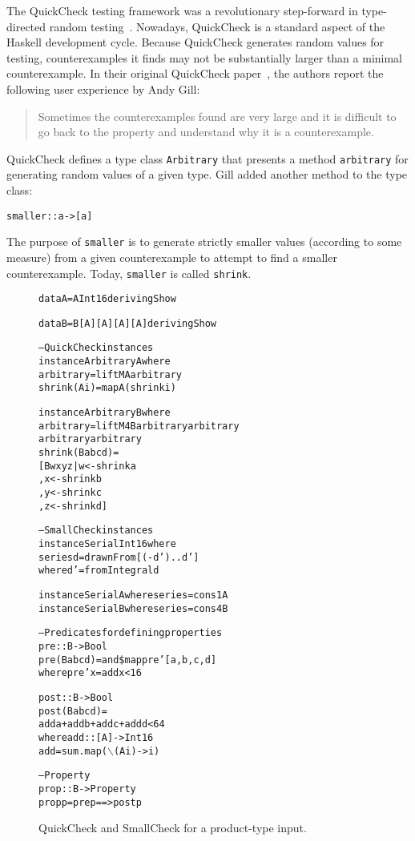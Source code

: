 \documentclass[10pt]{sigplanconf}
\newenvironment{code}{\begin{alltt}}{\end{alltt}}
\newcommand{\ttp}[1]{\texttt{#1}}
\begin{document}
The QuickCheck testing framework was a revolutionary step-forward in
type-directed random testing~\cite{qc}.  Nowadays, QuickCheck is a standard
aspect of the Haskell development cycle.  Because QuickCheck generates random
values for testing, counterexamples it finds may not be substantially larger
than a minimal counterexample.  In their original QuickCheck paper~\cite{qc},
the authors report the following user experience by Andy Gill:
%
\begin{quote}
Sometimes the counterexamples found are very large and it is difficult to go
back to the property and understand why it is a counterexample.
\end{quote}
%
\noindent
QuickCheck defines a type class \ttp{Arbitrary} that presents a method
\ttp{arbitrary} for generating random values of a given type.  Gill added another
method to the type class:
%
\begin{code}
smaller :: a -> [a] 
\end{code}
%
\noindent
The purpose of \ttp{smaller} is to generate strictly smaller values (according to
some measure) from a given counterexample to attempt to find a smaller
counterexample.  Today, \ttp{smaller} is called \ttp{shrink}.

\begin{figure}[ht]
\begin{code}
data A = A Int16 deriving Show

data B = B [A] [A] [A] [A] deriving Show

-- QuickCheck instances
instance Arbitrary A where
  arbitrary    = liftM A arbitrary
  shrink (A i) = map A (shrink i)

instance Arbitrary B where
  arbitrary = liftM4 B arbitrary arbitrary 
                       arbitrary arbitrary
  shrink (B a b c d) = 
    [ B w x y z | w <- shrink a
                , x <- shrink b
                , y <- shrink c
                , z <- shrink d ]

-- SmallCheck instances
instance Serial Int16 where
  series d = drawnFrom [(-d')..d'] 
    where d' = fromIntegral d

instance Serial A where series = cons1 A 
instance Serial B where series = cons4 B

-- Predicates for defining properties
pre :: B -> Bool
pre (B a b c d) = and \$ map pre' [a, b, c, d]
  where pre' x = add x < 16
  
post :: B -> Bool
post (B a b c d) = 
  add a + add b + add c + add d < 64
  where add :: [A] -> Int16
        add = sum . map (\(\backslash\)(A i) -> i)

-- Property
prop :: B -> Property
prop p = pre p ==> post p
\end{code}
  \caption{QuickCheck and SmallCheck for a product-type input.}
  \label{fig:initial}
\end{figure}
\end{document}
